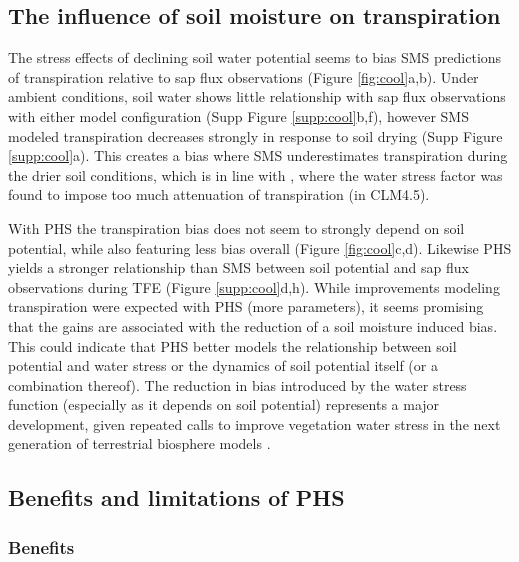 \documentclass[draft,linenumbers]{agujournal}
\begin{document}
\subsection{The influence of soil moisture on transpiration}
    \label{sect:smt}
    The stress effects of declining soil water potential seems to bias SMS predictions of transpiration relative to sap flux observations (Figure \ref{fig:cool}a,b).
    Under ambient conditions, soil water shows little relationship with sap flux observations with either model configuration (Supp Figure \ref{supp:cool}b,f),
    however SMS modeled transpiration decreases strongly in response to soil drying (Supp Figure \ref{supp:cool}a).
    This creates a bias where SMS underestimates transpiration during the drier soil conditions, 
    which is in line with \cite{bonan2014}, where the water stress factor was found to impose too much attenuation of transpiration (in CLM4.5).
    
    With PHS the transpiration bias does not seem to strongly depend on soil potential, while also featuring less bias overall (Figure \ref{fig:cool}c,d).
    Likewise PHS yields a stronger relationship than SMS between soil potential and sap flux observations during TFE (Figure \ref{supp:cool}d,h).
    While improvements modeling transpiration were expected with PHS (more parameters), it seems promising that the gains are associated with the reduction of a soil moisture induced bias.
    This could indicate that PHS better models the relationship between soil potential and water stress or the dynamics of soil potential itself (or a combination thereof).
    The reduction in bias introduced by the water stress function (especially as it depends on soil potential) represents a major development, given repeated calls to improve vegetation water stress in the next generation of terrestrial biosphere models \citep{powell2013,rogers2017,trugman2018}.

\subsection{Benefits and limitations of PHS}

\subsubsection{Benefits}
\end{document}
